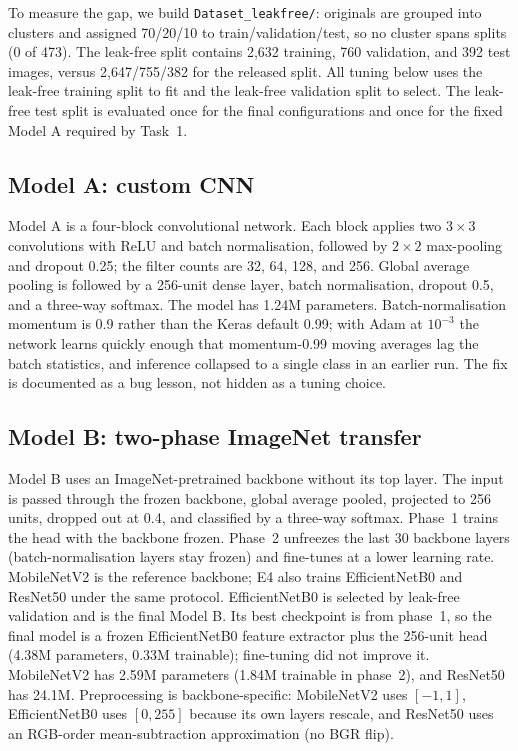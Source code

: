 \documentclass[11pt,a4paper]{article}
\begin{document}
To measure the gap, we build \texttt{Dataset\_leakfree/}: originals are grouped
into clusters and assigned 70/20/10 to train/validation/test, so no cluster
spans splits (0 of 473). The leak-free split contains 2,632 training, 760
validation, and 392 test images, versus 2,647/755/382 for the released split.
All tuning below uses the leak-free training split to fit and the leak-free
validation split to select. The leak-free test split is evaluated once for the
final configurations and once for the fixed Model A required by Task~1.

\subsection{Model A: custom CNN}
Model A is a four-block convolutional network. Each block applies two
$3\times3$ convolutions with ReLU and batch normalisation, followed by
$2\times2$ max-pooling and dropout 0.25; the filter counts are 32, 64, 128, and
256. Global average pooling is followed by a 256-unit dense layer, batch
normalisation, dropout 0.5, and a three-way softmax. The model has 1.24M
parameters. Batch-normalisation momentum is 0.9 rather than the Keras default
0.99; with Adam at $10^{-3}$ the network learns quickly enough that
momentum-0.99 moving averages lag the batch statistics, and inference collapsed
to a single class in an earlier run. The fix is documented as a bug lesson,
not hidden as a tuning choice.

\subsection{Model B: two-phase ImageNet transfer}
Model B uses an ImageNet-pretrained backbone without its top layer. The input
is passed through the frozen backbone, global average pooled, projected to 256
units, dropped out at 0.4, and classified by a three-way softmax. Phase~1
trains the head with the backbone frozen. Phase~2 unfreezes the last 30
backbone layers (batch-normalisation layers stay frozen) and fine-tunes at a
lower learning rate. MobileNetV2 is the reference backbone; E4 also trains
EfficientNetB0 and ResNet50 under the same protocol. EfficientNetB0 is selected
by leak-free validation and is the final Model B. Its best checkpoint is from
phase~1, so the final model is a frozen EfficientNetB0 feature extractor plus
the 256-unit head (4.38M parameters, 0.33M trainable); fine-tuning did not
improve it. MobileNetV2 has 2.59M parameters (1.84M trainable in phase~2), and
ResNet50 has 24.1M. Preprocessing is backbone-specific: MobileNetV2 uses
$[-1,1]$, EfficientNetB0 uses $[0,255]$ because its own layers rescale, and
ResNet50 uses an RGB-order mean-subtraction approximation (no BGR flip).
\end{document}
